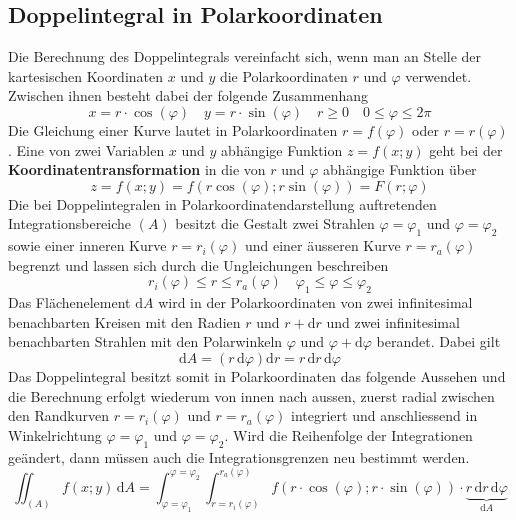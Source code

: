 \subsection{Doppelintegral in Polarkoordinaten}
Die Berechnung des Doppelintegrals vereinfacht sich, wenn man an Stelle der kartesischen Koordinaten $x$ und $y$ die Polarkoordinaten $r$ und $\varphi$ verwendet. Zwischen ihnen besteht dabei der folgende Zusammenhang
\begin{equation} 
\boxed{x=r\cdot \cos\left(\varphi\right)}\quad \boxed{y=r\cdot \sin\left(\varphi\right)}\quad \boxed{r\geq 0}\quad \boxed{0\leq \varphi\leq 2\pi}
\end{equation}
Die Gleichung einer Kurve lautet in Polarkoordinaten $r=f\left(\varphi\right)$ oder $r=r\left(\varphi\right)$. Eine von zwei Variablen $x$ und $y$ abhängige Funktion $z=f\left(x; y\right)$ geht bei der \textbf{Koordinatentransformation} in die von $r$ und $\varphi$ abhängige Funktion über
\begin{equation}
\boxed{z=f\left(x; y\right)=f\left(r\cos\left(\varphi\right); r\sin\left(\varphi\right)\right)=F\left(r; \varphi\right)}
\end{equation}
Die bei Doppelintegralen in Polarkoordinatendarstellung auftretenden Integrationsbereiche $\left(A\right)$ besitzt die Gestalt zwei Strahlen $\varphi=\varphi_1$ und $\varphi=\varphi_2$ sowie einer inneren Kurve $r=r_i\left(\varphi\right)$ und einer äusseren Kurve $r=r_a\left(\varphi\right)$ begrenzt und lassen sich durch die Ungleichungen beschreiben
\begin{equation}
\boxed{r_i\left(\varphi\right)\leq r\leq r_a\left(\varphi\right)}\quad \boxed{\varphi_1\leq \varphi\leq \varphi_2} 
\end{equation}
Das Flächenelement $\text{d}A$ wird in der Polarkoordinaten von zwei infinitesimal benachbarten Kreisen mit den Radien $r$ und $r+\text{d}r$ und zwei infinitesimal benachbarten Strahlen mit den Polarwinkeln $\varphi$ und $\varphi+\text{d}\varphi$ berandet. Dabei gilt
\begin{equation}
\boxed{\text{d}A=\left(r\,\text{d}\varphi\right)\text{d}r=r\,\text{d}r\,\text{d}\varphi}
\end{equation}
Das Doppelintegral besitzt somit in Polarkoordinaten das folgende Aussehen und die Berechnung erfolgt wiederum von innen nach aussen, zuerst radial zwischen den Randkurven $r=r_i\left(\varphi\right)$ und $r=r_a\left(\varphi\right)$ integriert und anschliessend in Winkelrichtung $\varphi=\varphi_1$ und $\varphi=\varphi_2$. Wird die Reihenfolge der Integrationen geändert, dann müssen auch die Integrationsgrenzen neu bestimmt werden.
\begin{equation} 
\boxed{\displaystyle \iint_{\left(A\right)}f\left(x; y\right)\,\text{d}A=\displaystyle \int_{\varphi=\varphi_1}^{\varphi=\varphi_2}\displaystyle \int_{r=r_i\left(\varphi\right)}^{r_a\left(\varphi\right)}f\left(r\cdot \cos\left(\varphi\right); r\cdot \sin\left(\varphi\right)\right)\cdot \underbrace{r\,\text{d}r\,\text{d}\varphi}_{\text{d}A}}
\end{equation} 
